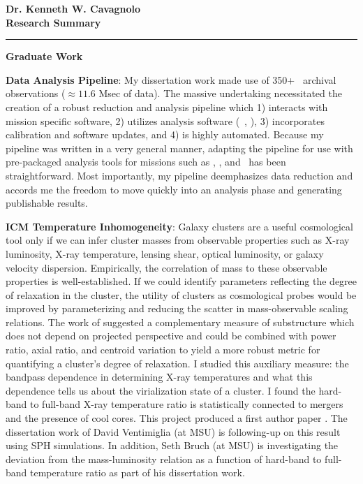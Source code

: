 \documentclass[12pt]{article}
\begin{document}
\begin{center}
{\large \textbf{Dr. Kenneth W. Cavagnolo\\Research Summary}}
\rule{17cm}{2pt}
\end{center}
\normalsize

{\bfseries{Graduate Work}}

{\bfseries{Data Analysis Pipeline}}: My dissertation work made use of
350+ \chandra\ archival observations ($\approx 11.6$ Msec of
data). The massive undertaking necessitated the creation of a robust
reduction and analysis pipeline which 1) interacts with mission
specific software, 2) utilizes analysis software (\eg\ \xspec, \idl),
3) incorporates calibration and software updates, and 4) is highly
automated. Because my pipeline was written in a very general manner,
adapting the pipeline for use with pre-packaged analysis tools for
missions such as \xmm, \spitzer, and
\vla\ has been straightforward. Most importantly, my pipeline
deemphasizes data reduction and accords me the freedom to move quickly
into an analysis phase and generating publishable results.

{\bfseries{ICM Temperature Inhomogeneity}}: Galaxy clusters are a
useful cosmological tool only if we can infer cluster masses from
observable properties such as X-ray luminosity, X-ray temperature,
lensing shear, optical luminosity, or galaxy velocity
dispersion. Empirically, the correlation of mass to these observable
properties is well-established. If we could identify parameters
reflecting the degree of relaxation in the cluster, the utility of
clusters as cosmological probes would be improved by parameterizing
and reducing the scatter in mass-observable scaling relations. The
work of \cite{2001ApJ...546..100M} suggested a complementary measure
of substructure which does not depend on projected perspective and
could be combined with power ratio, axial ratio, and centroid
variation to yield a more robust metric for quantifying a cluster's
degree of relaxation. I studied this auxiliary measure: the bandpass
dependence in determining X-ray temperatures and what this dependence
tells us about the virialization state of a cluster. I found the
hard-band to full-band X-ray temperature ratio is statistically
connected to mergers and the presence of cool cores. This project
produced a first author paper \cite{xrayband}. The dissertation work
of David Ventimiglia (at MSU) is following-up on this result using SPH
simulations. In addition, Seth Bruch (at MSU) is investigating the
deviation from the mass-luminosity relation as a function of hard-band
to full-band temperature ratio as part of his dissertation work.
\end{document}
